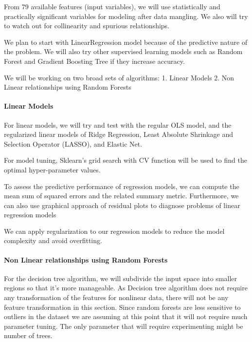 \documentclass[11pt]{article}
\begin{document}
From 79 available features (input variables), we will use statistically
and practically significant variables for modeling after data mangling.
We also will try to watch out for collinearity and spurious
relationships.

We plan to start with LinearRegression model because of the predictive
nature of the problem. We will also try other supervised learning models
such as Random Forest and Gradient Boosting Tree if they increase
accuracy.

We will be working on two broad sets of algorithms: 1. Linear Models 2.
Non Linear relationships using Random Forests

\paragraph{Linear Models}\label{linear-models}

For linear models, we will try and test with the regular OLS model, and
the regularized linear models of Ridge Regression, Least Absolute
Shrinkage and Selection Operator (LASSO), and Elastic Net.

For model tuning, Sklearn's grid search with CV function will be used to
find the optimal hyper-parameter values.

To assess the predictive performance of regression models, we can
compute the mean sum of squared errors and the related summary metric.
Furthermore, we can also use graphical approach of residual plots to
diagnose problems of linear regression models

We can apply regularization to our regression models to reduce the model
complexity and avoid overfitting.

\paragraph{Non Linear relationships using Random
Forests}\label{non-linear-relationships-using-random-forests}

For the decision tree algorithm, we will subdivide the input space into
smaller regions so that it's more manageable. As Decision tree algorithm
does not require any transformation of the features for nonlinear data,
there will not be any feature transformation in this section. Since
random forests are less sensitive to outliers in the dataset we are
assuming at this point that it will not require much parameter tuning.
The only parameter that will require experimenting might be number of
trees.
\end{document}
